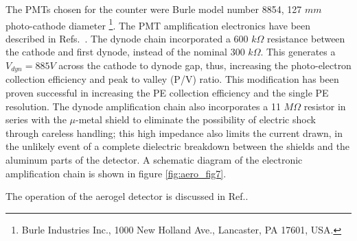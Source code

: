 The PMTs chosen for the counter were Burle model number 8854, 127 $mm$ photo-cathode 
diameter
\footnote{Burle Industries Inc., 1000 New Holland Ave., Lancaster, PA 17601, USA.}.
  The PMT amplification electronics have been described in 
Refs.~\cite{Alexa:1995ne,Lolos:1997vz}.  The dynode chain incorporated a
600 $k\Omega$ resistance between the cathode and first dynode, instead of the
nominal 300 $k\Omega$.  This generates a $V_{dyn}=885 V$ across the cathode to
dynode gap, thus, increasing the photo-electron collection efficiency and peak
to valley (P/V) ratio.  This modification has been proven successful in
increasing the PE collection efficiency and the single PE resolution.  The
dynode amplification chain also incorporates a 11 $M\Omega$ resistor in series
with the $\mu$-metal shield to eliminate the possibility of electric shock
through careless handling; this high impedance also limits the current drawn,
in the unlikely event of a complete dielectric breakdown between the shields
and the aluminum parts of the detector. A schematic diagram of the electronic 
amplification chain is shown in figure \ref{fig:aero_fig7}. 

The operation of the aerogel detector is discussed in Ref.\cite{Brash:2002vn}.



